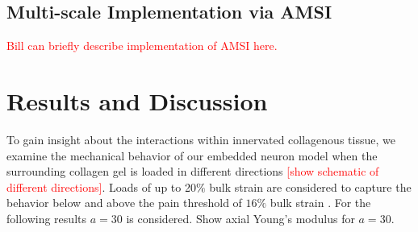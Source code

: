 \documentclass[10pt]{asme2ej}
\begin{document}
\subsection{Multi-scale Implementation via AMSI}
\textcolor{red}{Bill can briefly describe implementation of AMSI here.}

\section{Results and Discussion}
To gain insight about the interactions within innervated collagenous tissue, we examine the mechanical behavior of our embedded neuron model when the surrounding collagen gel is loaded in different directions \textcolor{red}{[show schematic of different directions]}.  Loads of up to 20$\%$ bulk strain are considered to capture the behavior below and above the pain threshold of $16\%$ bulk strain \cite{Zhang:2016ga}. For the following results $a=30$ is considered. Show axial Young's modulus for $a=30$.

\end{document}
